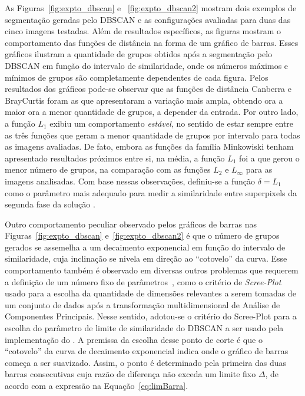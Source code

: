 As Figuras~\ref{fig:expto_dbscan} e ~\ref{fig:expto_dbscan2} mostram dois exemplos de segmentação geradas pelo DBSCAN e as configurações avaliadas para duas das cinco imagens testadas.
Além de resultados específicos, as figuras mostram o comportamento das funções de distância na forma de um gráfico de barras.
Esses gráficos ilustram a quantidade de grupos obtidos após a segmentação pelo DBSCAN em função do intervalo de similaridade, onde os números máximos e mínimos de grupos são completamente dependentes de cada figura.
Pelos resultados dos gráficos pode-se observar que as funções de distância Canberra e BrayCurtis foram as que apresentaram a variação mais ampla, obtendo ora a maior ora a menor quantidade de grupos, a depender da entrada.
Por outro lado, a função $L_1$ exibiu um comportamento \textit{estável}, no sentido de estar sempre entre as três funções que geram a menor quantidade de grupos por intervalo para todas as imagens avaliadas.
De fato, embora as funções da família Minkowiski tenham apresentado resultados próximos entre si, na média, a função $L_1$ foi a que gerou o menor número de grupos, na comparação com as funções $L_2$ e $L_\infty$ para as imagens analisadas.
Com base nessas observações, definiu-se a função $\delta = L_1$ como o parâmetro mais adequado para medir a similaridade entre superpixels da segunda fase da solução \system.

Outro comportamento peculiar observado pelos gráficos de barras nas Figuras~\ref{fig:expto_dbscan} e~\ref{fig:expto_dbscan2} é que o número de grupos gerados se assemelha a um decaimento exponencial em função do intervalo de similaridade, cuja inclinação se nivela em direção ao ``cotovelo'' da curva.
Esse comportamento também é observado em diversas outros problemas que requerem a definição de um número fixo de parâmetros~\cite{Jolliffe2011,Semaan2012}, como o critério de \textit{Scree-Plot} usado para a escolha da quantidade de dimensões relevantes a serem tomadas de um conjunto de dados após a transformação multidimensional de Análise de Componentes Principais.
Nesse sentido, adotou-se o critério do Scree-Plot para a escolha do parâmetro de limite de similaridade do DBSCAN a ser usado pela implementação do \system.
A premissa da escolha desse ponto de corte é que o ``cotovelo'' da curva de decaimento exponencial indica onde o gráfico de barras começa a ser suavizado.
Assim, o ponto é determinado pela primeira das duas barras consecutivas cuja razão de diferença não exceda um limite fixo $\Delta$, de acordo com a expressão na Equação~\ref{eq:limBarra}.

